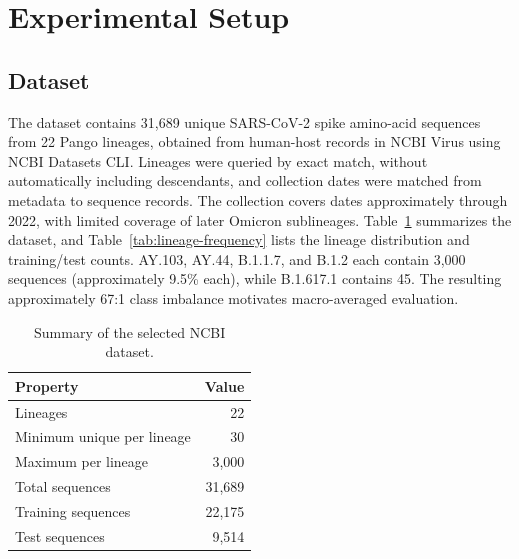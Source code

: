 \documentclass[conference]{IEEEtran}
\begin{document}
\section{Experimental Setup}
\label{sec:setup}

\subsection{Dataset}
\label{sec:dataset}

The dataset contains 31,689 unique SARS-CoV-2 spike amino-acid sequences from 22 Pango lineages, obtained from human-host records in NCBI Virus using NCBI Datasets CLI. Lineages were queried by exact match, without automatically including descendants, and collection dates were matched from metadata to sequence records. The collection covers dates approximately through 2022, with limited coverage of later Omicron sublineages. Table~\ref{tab:dataset-summary} summarizes the dataset, and Table~\ref{tab:lineage-frequency} lists the lineage distribution and training/test counts. AY.103, AY.44, B.1.1.7, and B.1.2 each contain 3,000 sequences (approximately 9.5\% each), while B.1.617.1 contains 45. The resulting approximately 67:1 class imbalance motivates macro-averaged evaluation.

\begin{table}[!t]
    \centering
    \caption{Summary of the selected NCBI dataset.}
    \label{tab:dataset-summary}
    \small
    \setlength{\tabcolsep}{0pt}
    \renewcommand{\arraystretch}{1.15}
    \begin{tabular*}{\columnwidth}{@{\extracolsep{\fill}}lr@{}}
        \toprule
        Property & Value \\
        \midrule
        Lineages & 22 \\
        Minimum unique per lineage & 30 \\
        Maximum per lineage & 3,000 \\
        Total sequences & 31,689 \\
        Training sequences & 22,175 \\
        Test sequences & 9,514 \\
        \bottomrule
    \end{tabular*}
\end{table}
\end{document}
